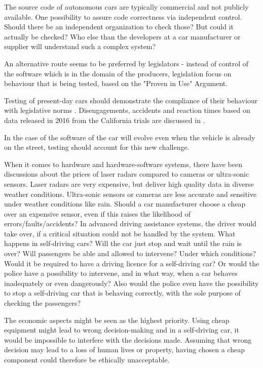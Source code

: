 The source code of autonomous cars are typically commercial and not publicly available. One possibility to assure code correctness via independent control. Should there be an independent organization to check those? But could it actually be checked? Who else than the developers at a car manufacturer or supplier will understand such a complex system? 

An alternative route seems to be preferred by legislators - instead of control of the software which is in the domain of the producers, legislation focus on behaviour that is being tested, based on the "Proven in Use" Argument.

Testing of present-day cars should demonstrate the compliance of their behaviour with legislative norms \cite{DepartmentofMotorVehiclesStateofCalifornia}. Disengagements, accidents and reaction times based on data released in 2016 from the California trials are discussed in \cite{10.1371/journal.pone.0168054}.

In the case of the software of the car will evolve even when the vehicle is already on the street, testing should account for this new challenge.

When it comes to hardware and hardware-software systems, there have been discussions about the prices of laser radars compared to cameras or ultra-sonic sensors. Laser radars are very expensive, but deliver high quality data in diverse weather conditions. Ultra-sonic sensors or cameras are less accurate and sensitive under weather conditions like rain. 
Should a car manufacturer choose a cheap over an expensive sensor, even if this raises the likelihood of errors/faults/accidents? In advanced driving assistance systems, the driver would take over, if a critical situation could not be handled by the system. What happens in self-driving cars? Will the car just stop and wait until the rain is over? Will passengers be able and allowed to intervene? Under which conditions? Would it be required to have a driving licence for a self-driving car? Or would the police have a possibility to intervene, and in what way, when a car behaves inadequately or even dangerously? Also would the police even have the possibility to stop a self-driving car that is behaving correctly, with the sole purpose of checking the passengers?

The economic aspects might be seen as the highest priority. Using cheap equipment might lead to wrong decision-making and in a self-driving car, it would be impossible to interfere with the decisions made. Assuming that wrong decision may lead to a loss of human lives or property, having chosen a cheap component could therefore be ethically unacceptable.

